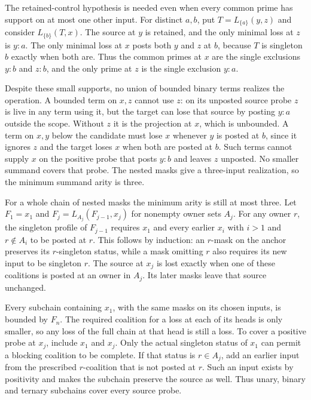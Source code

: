 The retained-control hypothesis is needed even when every
common prime has support on at most one other input. For
distinct $a,b$, put $T=L_{\{a\}}(y,z)$ and consider
$L_{\{b\}}(T,x)$. The source at $y$ is retained, and the
only minimal loss at $z$ is $y:a$. The only minimal loss at $x$ posts both
$y$ and $z$ at $b$, because $T$ is singleton $b$ exactly
when both are. Thus the common primes at $x$ are the
single exclusions $y:b$ and $z:b$, and the only prime at
$z$ is the single exclusion $y:a$.

Despite these small supports, no union of bounded binary
terms realizes the operation. A bounded term on $x,z$ cannot
use $z$: on its unposted source probe $z$ is live in any
term using it, but the target can lose that source by posting
$y:a$ outside the scope. Without $z$ it is the projection
at $x$, which is unbounded. A term on $x,y$ below the
candidate must lose $x$ whenever $y$ is posted at $b$,
since it ignores $z$ and the target loses $x$ when both
are posted at $b$. Such terms cannot supply $x$ on the
positive probe that posts $y:b$ and leaves $z$ unposted.
No smaller summand covers that probe. The nested masks
give a three-input realization, so the minimum summand
arity is three.

For a whole chain of nested masks the minimum arity is
still at most three. Let $F_1=x_1$ and
$F_j=L_{A_j}(F_{j-1},x_j)$ for nonempty owner sets $A_j$.
For any owner $r$, the singleton profile of $F_{j-1}$
requires $x_1$ and every earlier $x_i$ with $i>1$ and
$r\notin A_i$ to be posted at $r$. This follows by
induction: an $r$-mask on the anchor preserves its
$r$-singleton status, while a mask omitting $r$ also
requires its new input to be singleton $r$. The source
at $x_j$ is lost exactly when one of these coalitions
is posted at an owner in $A_j$. Its later masks leave
that source unchanged.

Every subchain containing $x_1$, with the same masks on
its chosen inputs, is bounded by $F_n$. The required
coalition for a loss at each of its heads is only smaller,
so any loss of the full chain at that head is still a
loss. To cover a positive probe at $x_j$, include $x_1$
and $x_j$. Only the actual singleton status of $x_1$ can
permit a blocking coalition to be complete. If that status
is $r\in A_j$, add an earlier input from the prescribed
$r$-coalition that is not posted at $r$. Such an input
exists by positivity and makes the subchain preserve the
source as well. Thus unary, binary and ternary subchains
cover every source probe.

